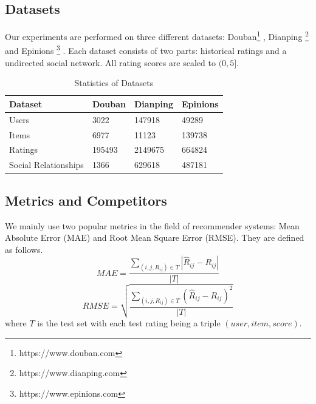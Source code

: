 \documentclass{article}
\begin{document}
\subsection{Datasets}
Our experiments are performed on three different datasets: Douban\footnote{https://www.douban.com} \cite{doubands}, 
Dianping \footnote{https://www.dianping.com} \cite{dianpingds} and Epinions \footnote{https://www.epinions.com} \cite{epinionsds}. Each dataset consists of two parts: historical ratings and a undirected social network.
All rating scores are scaled to $(0, 5]$.
\begin{table}[h]
  \caption{Statistics of Datasets}
  \label{sample-table}
  \centering
  \begin{tabular}{llll}
    \toprule
    Dataset  & Douban  & Dianping & Epinions \\
    \midrule
    Users & 3022     & 147918     & 49289  \\
    Items & 6977     & 11123      & 139738 \\
    Ratings & 195493 & 2149675    & 664824 \\
    Social Relationships & 1366 & 629618 & 487181 \\
    \bottomrule
  \end{tabular}
\end{table}
\subsection{Metrics and Competitors}
We mainly use two popular metrics in the field of recommender systems: 
Mean Absolute Error (MAE) and Root Mean Square Error (RMSE). They are defined as follows.
$$
MAE = \frac{\sum_{(i, j, R_{ij}) \in T} |\hat{R}_{ij} - R_{ij}|}{|T|}
$$
$$
RMSE = \sqrt{ \frac{\sum_{(i, j, R_{ij}) \in T} (\hat{R}_{ij} - R_{ij})^2}{|T|} }
$$
where $T$ is the test set with each test rating being a triple $(user, item, score)$.
\end{document}
